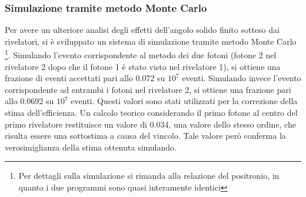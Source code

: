 \subsubsection{Simulazione tramite metodo Monte Carlo}

Per avere un ulteriore analisi degli effetti dell'angolo solido finito sotteso dai rivelatori, si è sviluppato un sistema di simulazione tramite metodo Monte Carlo \footnote{Per dettagli sulla simulazione si rimanda alla relazione del positronio, in quanto i due programmi sono quasi interamente identici}. Simulando l'evento corrispondente al metodo dei due fotoni (fotone 2 nel rivelatore 2 dopo che il fotone 1 è stato visto nel rivelatore 1), si ottiene una frazione di eventi accettati pari allo 0.072 su $10^7$ eventi. Simulando invece l'evento corrispondente ad entrambi i fotoni nel rivelatore 2, si ottiene una frazione pari allo 0.0692 su $10^7$ eventi. Questi valori sono stati utilizzati per la correzione della stima dell'efficienza. Un calcolo teorico considerando il primo fotone al centro del primo rivelatore restituisce un valore di 0.034, una valore dello stesso ordine, che risulta essere una sottostima a causa del vincolo. Tale valore però conferma la verosimiglianza della stima ottenuta simulando.
